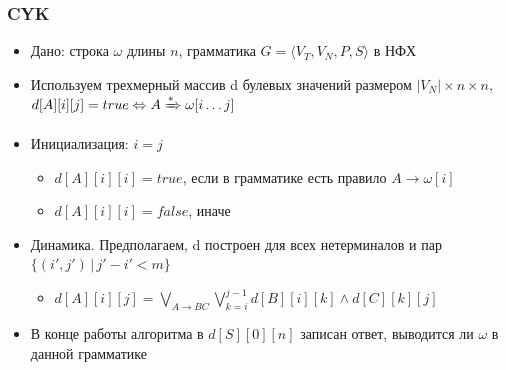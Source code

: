 \documentclass{beamer}
\newcommand{\derive}[0]{\xRightarrow[]{*}}
\begin{document}
\begin{frame}[fragile]
  \transwipe[direction=90]
  \frametitle{CYK}
  \begin{itemize}
      \item Дано: строка $\omega$ длины $n$, грамматика $G = \langle V_T, V_N, P, S\rangle$ в НФХ
      \item Используем трехмерный массив d булевых значений размером $|V_N| \times n \times n$, $d[A][i][j] = true \Leftrightarrow A \derive \omega[i \dots j]$
      \item Инициализация: $i = j$
      \begin{itemize}
        \item $d[A][i][i] = true$, если в грамматике есть правило $A \rightarrow \omega[i]$
        \item $d[A][i][i] = false$, иначе
      \end{itemize}
      \item Динамика. Предполагаем, d построен для всех нетерминалов и пар $\{(i', j') \, | \, j' - i' < m \}$
      \begin{itemize}
        \item $d[A][i][j] = \bigvee_{A\rightarrow BC}^{}{\bigvee_{k=i}^{j-1}{d[B][i][k] \wedge d[C][k][j]}}$
      \end{itemize}
      \item В конце работы алгоритма в $d[S][0][n]$ записан ответ, выводится ли $\omega$ в данной грамматике
  \end{itemize}
\end{frame}

 
\end{document}
